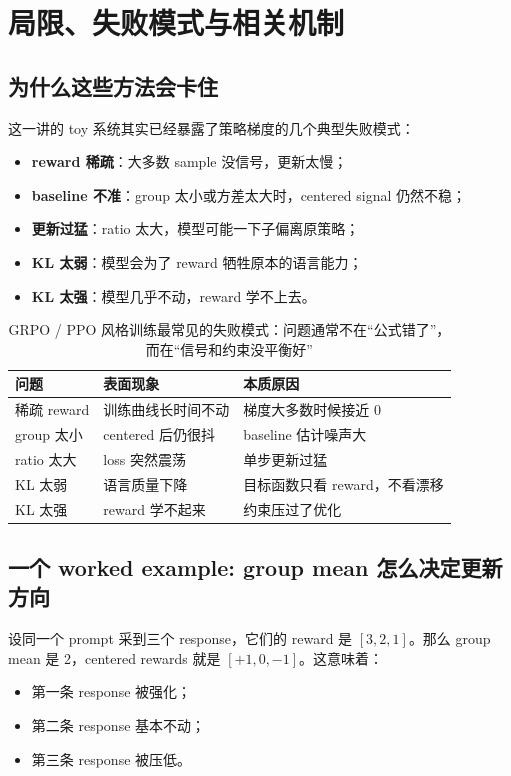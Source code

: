 \section{局限、失败模式与相关机制}

\subsection{为什么这些方法会卡住}

这一讲的 toy 系统其实已经暴露了策略梯度的几个典型失败模式：
\begin{itemize}
    \item \textbf{reward 稀疏}：大多数 sample 没信号，更新太慢；
    \item \textbf{baseline 不准}：group 太小或方差太大时，centered signal 仍然不稳；
    \item \textbf{更新过猛}：ratio 太大，模型可能一下子偏离原策略；
    \item \textbf{KL 太弱}：模型会为了 reward 牺牲原本的语言能力；
    \item \textbf{KL 太强}：模型几乎不动，reward 学不上去。
\end{itemize}

\begin{table}[H]
\centering
\begin{tabular}{@{}p{3.1cm}p{4.5cm}p{5.1cm}@{}}
\toprule
\textbf{问题} & \textbf{表面现象} & \textbf{本质原因} \\
\midrule
稀疏 reward & 训练曲线长时间不动 & 梯度大多数时候接近 0 \\
group 太小 & centered 后仍很抖 & baseline 估计噪声大 \\
ratio 太大 & loss 突然震荡 & 单步更新过猛 \\
KL 太弱 & 语言质量下降 & 目标函数只看 reward，不看漂移 \\
KL 太强 & reward 学不起来 & 约束压过了优化 \\
\bottomrule
\end{tabular}
\caption{GRPO / PPO 风格训练最常见的失败模式：问题通常不在“公式错了”，而在“信号和约束没平衡好”}
\end{table}

\subsection{一个 worked example: group mean 怎么决定更新方向}

设同一个 prompt 采到三个 response，它们的 reward 是 $[3,2,1]$。那么 group mean 是 2，centered rewards 就是 $[+1,0,-1]$。这意味着：
\begin{itemize}
    \item 第一条 response 被强化；
    \item 第二条 response 基本不动；
    \item 第三条 response 被压低。
\end{itemize}


